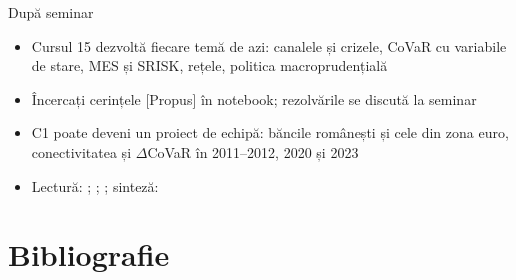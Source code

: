 \begin{frame}{După seminar}
\itemsize{\small}
\begin{itemize}
    \item Cursul 15 dezvoltă fiecare temă de azi: canalele și crizele, CoVaR cu variabile de stare, MES și SRISK, rețele, politica macroprudențială
    \item Încercați cerințele [Propus] în notebook; rezolvările se discută la seminar
    \item C1 poate deveni un proiect de echipă: băncile românești și cele din zona euro, conectivitatea și $\Delta$CoVaR în 2011--2012, 2020 și 2023
    \item Lectură: ; ; ; sinteză: 
\end{itemize}
\end{frame}


\section{Bibliografie}

